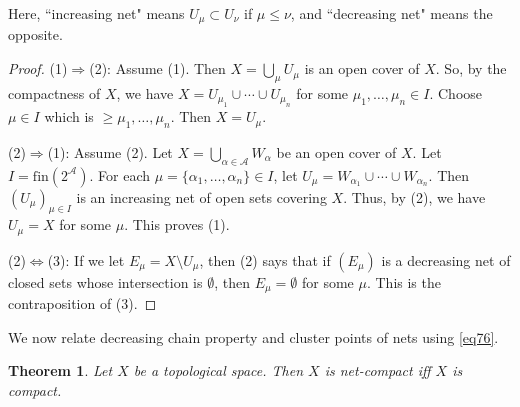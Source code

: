 \documentclass[12pt,b5paper,notitlepage]{article}
\theoremstyle{definition}
\theoremstyle{plain}
\newtheorem{thm}[df]{Theorem}
\newcommand{\scr}{\mathscr}
\newcommand{\fin}{\mathrm{fin}}
\numberwithin{equation}{section}
\begin{document}
Here, ``increasing net" means $U_\mu\subset U_\nu$ if $\mu\leq \nu$, and ``decreasing net" means the opposite.

\begin{proof}
(1)$\Rightarrow$(2): Assume (1). Then $X=\bigcup_\mu U_\mu$ is an open cover of $X$. So, by the compactness of $X$, we have $X=U_{\mu_1}\cup\cdots\cup U_{\mu_n}$ for some $\mu_1,\dots,\mu_n\in I$. Choose $\mu\in I$ which is $\geq \mu_1,\dots,\mu_n$. Then $X=U_\mu$.

(2)$\Rightarrow$(1): Assume (2). Let $X=\bigcup_{\alpha\in\scr A} W_\alpha$ be an open cover of $X$. Let $I=\fin(2^{\scr A})$. For each $\mu=\{\alpha_1,\dots,\alpha_n\}\in I$, let $U_\mu=W_{\alpha_1}\cup\cdots\cup W_{\alpha_n}$. Then $(U_\mu)_{\mu\in I}$ is an increasing net of open sets covering $X$. Thus, by (2), we have $U_\mu=X$ for some $\mu$. This proves (1).

(2)$\Leftrightarrow$(3): If we let $E_\mu=X\setminus U_\mu$, then (2) says that if $(E_\mu)$ is a decreasing net of closed sets whose intersection is $\emptyset$, then $E_\mu=\emptyset$ for some $\mu$. This is the contraposition of (3).
\end{proof}


We now relate decreasing chain property and cluster points of nets using \eqref{eq76}.






\begin{thm}\label{lb232}
Let $X$ be a topological space. Then $X$ is net-compact iff $X$ is compact. 
\end{thm}
\end{document}
